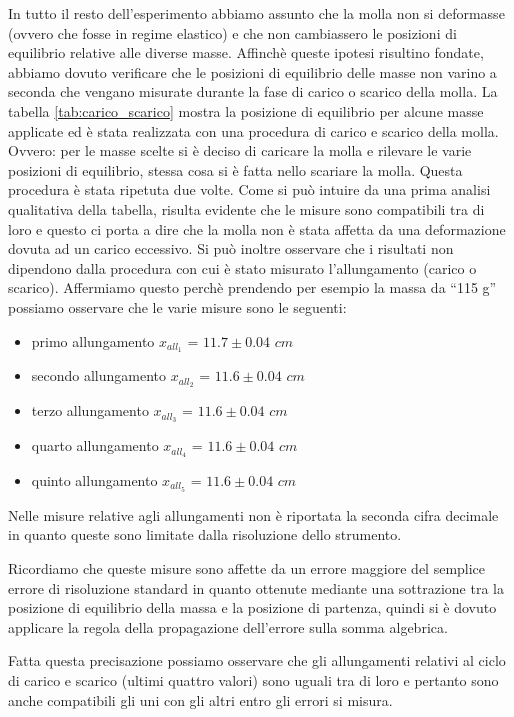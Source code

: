 In tutto il resto dell'esperimento abbiamo assunto che la molla non si deformasse (ovvero che fosse in regime elastico)
e che non cambiassero le posizioni di equilibrio relative alle diverse masse. Affinchè queste ipotesi risultino fondate,
abbiamo dovuto verificare che le posizioni di equilibrio delle masse non varino a seconda che vengano misurate durante la fase di carico o scarico della molla. La tabella \ref{tab:carico_scarico} mostra la posizione di equilibrio per alcune masse applicate ed è stata realizzata con una procedura di carico e scarico della molla. Ovvero: per le masse scelte si è deciso di caricare la molla e rilevare le varie posizioni di equilibrio, stessa cosa si è fatta nello scariare la molla. Questa procedura è stata ripetuta due volte.
Come si può intuire da una prima analisi qualitativa della tabella, risulta evidente che le misure sono compatibili tra di loro e questo ci porta a dire che la molla non è stata affetta da una deformazione dovuta ad un carico eccessivo. Si può inoltre osservare che i risultati non dipendono dalla procedura con cui è stato misurato l'allungamento (carico o scarico).
Affermiamo questo perchè prendendo per esempio la massa da ``115 g'' possiamo osservare che le varie misure sono le seguenti:
\begin{itemize}
	\item{primo allungamento $x_{all_1}$ = $11.7 \pm 0.04 \,\,cm$}
	\item{secondo allungamento $x_{all_2}$ = $11.6 \pm 0.04 \,\,cm$}
	\item{terzo allungamento $x_{all_3}$ = $11.6 \pm 0.04 \,\,cm$}
	\item{quarto allungamento $x_{all_4}$ = $11.6 \pm 0.04 \,\,cm$}
	\item{quinto allungamento $x_{all_5}$ = $11.6 \pm 0.04 \,\,cm$}
\end{itemize}
%
Nelle misure relative agli allungamenti non è riportata la seconda cifra decimale in quanto queste sono limitate dalla risoluzione dello strumento.

Ricordiamo che queste misure sono affette da un errore maggiore del semplice errore di risoluzione standard in quanto ottenute mediante una sottrazione tra la posizione di equilibrio della massa e la posizione di partenza, quindi si è dovuto applicare la regola della propagazione dell'errore sulla somma algebrica.

Fatta questa precisazione possiamo osservare che gli allungamenti relativi al ciclo di carico e scarico (ultimi quattro valori) sono uguali tra di loro e pertanto sono anche compatibili gli uni con gli altri entro gli errori si misura.

